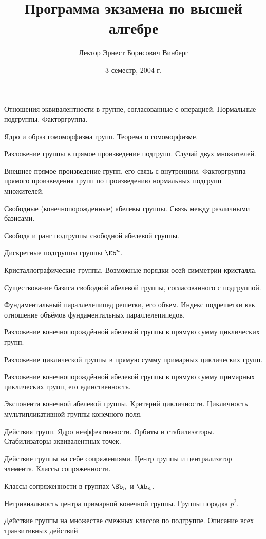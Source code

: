 \documentclass[a4paper]{article}
\title{Программа экзамена по высшей алгебре}
\author{Лектор Эрнест Борисович Винберг}
\date{3 семестр, 2004 г.}
\begin{document}
\maketitle
\begin{nums}{-1}
\item Отношения эквивалентности в группе, согласованные с операцией. Нормальные подгруппы. Факторгруппа.
\item Ядро и образ гомоморфизма групп. Теорема о гомоморфизме.
\item Разложение группы в прямое произведение подгрупп. Случай двух множителей.
\item Внешнее прямое произведение групп, его связь с внутренним. Факторгруппа прямого
      произведения групп по произведению нормальных подгрупп множителей.
\item Свободные (конечнопорожденные) абелевы группы. Связь между различными базисами.
\item Свобода и ранг подгруппы свободной абелевой группы.
\item Дискретные подгруппы группы $\Eb^n$.
\item Кристаллографические группы. Возможные порядки осей симметрии кристалла.
\item Существование базиса свободной абелевой группы, согласованного с подгруппой.
\item Фундаментальный параллелепипед решетки, его объем. Индекс подрешетки как отношение
      объёмов фундаментальных параллелепипедов.
\item Разложение конечнопорождённой абелевой группы в прямую сумму циклических групп.
\item Разложение циклической группы в прямую сумму примарных циклических групп.
\item Разложение конечнопорождённой абелевой группы в прямую сумму примарных циклических групп, его единственность.
\item Экспонента конечной абелевой группы. Критерий цикличности. Цикличность мультипликативной группы конечного поля.
\item Действия групп. Ядро неэффективности. Орбиты и стабилизаторы. Стабилизаторы эквивалентных точек.
\item Действие группы на себе сопряжениями. Центр группы и централизатор элемента. Классы сопряженности.
\item Классы сопряженности в группах $\Sb_n$ и $\Ab_n$.
\item Нетривиальность центра примарной конечной группы. Группы порядка $p^2$.
\item Действие группы на множестве смежных классов по подгруппе. Описание всех транзитивных действий

\end{nums}
\end{document}

